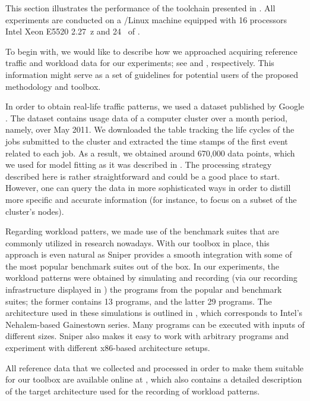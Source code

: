 
This section illustrates the performance of the toolchain presented in
. All experiments are conducted on a /Linux machine
equipped with 16 processors Intel Xeon E5520 2.27~z and 24~ of
.

To begin with, we would like to describe how we approached acquiring reference
traffic and workload data for our experiments; see  and
, respectively. This information might serve as a set of
guidelines for potential users of the proposed methodology and toolbox.

In order to obtain real-life traffic patterns, we used a dataset published by
Google \cite{google}. The dataset contains usage data of a computer cluster over
a month period, namely, over May 2011. We downloaded the table tracking the life
cycles of the jobs submitted to the cluster and extracted the time stamps of the
first event related to each job. As a result, we obtained around 670,000 data
points, which we used for model fitting as it was described in .
The processing strategy described here is rather straightforward and could be a
good place to start. However, one can query the data in more sophisticated ways
in order to distill more specific and accurate information (for instance, to
focus on a subset of the cluster's nodes).

Regarding workload patters, we made use of the benchmark suites that are
commonly utilized in research nowadays. With our toolbox in place, this approach
is even natural as Sniper provides a smooth integration with some of the most
popular benchmark suites out of the box. In our experiments, the workload
patterns were obtained by simulating and recording (via our recording
infrastructure displayed in ) the programs from the popular
 \cite{bienia2011} and  \cite{cpu2006} benchmark
suites; the former contains 13 programs, and the latter 29 programs. The
architecture used in these simulations is outlined in , which
corresponds to Intel's Nehalem-based Gainestown series. Many programs can be
executed with inputs of different sizes. Sniper also makes it easy to work with
arbitrary programs and experiment with different x86-based architecture setups.

All reference data that we collected and processed in order to make them
suitable for our toolbox are available online at \cite{sources}, which also
contains a detailed description of the target architecture used for the
recording of workload patterns.

